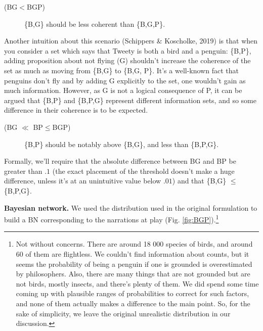 \documentclass[
  10pt,
]{scrartcl}
\newcommand{\s}[1]{\textsf{#1}}
\begin{document}
\vspace{2mm}\begin{description}
    \item[(\s{BG}$<$\s{BGP})] \{\s{B},\s{G}\}  should be less coherent than \{\s{B},\s{G},\s{P}\}. 
\end{description}\vspace{2mm}

Another intuition about this scenario (Schippers \& Koscholke, 2019) is that when you consider a set which says that Tweety is both a bird and a penguin: \{\s{B},\s{P}\}, adding proposition about not flying (\s{G}) shouldn't increase the coherence of the set as much as moving from \{\s{B},\s{G}\} to \{\s{B},\s{G}, \s{P}\}. It's a well-known fact that penguins don't fly and by adding \s{G} explicitly to the set, one wouldn't gain as much information.
However, as \s{G} is not a logical consequence of \s{P}, it can be argued that \{\s{B},\s{P}\} and \{\s{B},\s{P},\s{G}\} represent different information sets, and so some difference in their coherence is to be expected.

\vspace{2mm}\begin{description}
    \item[(\s{BG} $\ll$ \s{BP}$\leq$\s{BGP})]  \{\s{B},\s{P}\} should be notably above  \{\s{B},\s{G}\}, and less than \{\s{B},\s{P},\s{G}\}.
\end{description}\vspace{2mm}

\noindent Formally, we'll require that the absolute difference between \s{BG} and \s{BP} be greater than \(.1\) (the exact placement of the threshold doesn't make a huge difference, unless it's at an unintuitive value below \(.01\)) and that \{\s{B},\s{G}\} \(\leq\) \{\s{B},\s{P},\s{G}\}.

\noindent \textbf{Bayesian network.} We used the distribution used in the original formulation to build a BN corresponding to the narrations at play (Fig. \ref{fig:BGP}).\footnote{Not without concerns. There are around 18 000 species of birds, and around 60 of them are flightless. We  couldn't find information about counts, but it seems the probability of being a penguin if one is grounded is overestimated by philosophers.  Also, there are many things that are not grounded but are not birds, mostly insects, and there's plenty of them. We did spend some time coming up with plausible ranges of probabilities to correct for such factors, and none of them actually makes a difference to the main point. So, for the sake of simplicity, we leave the original unrealistic distribution in our discussion.}
\end{document}
